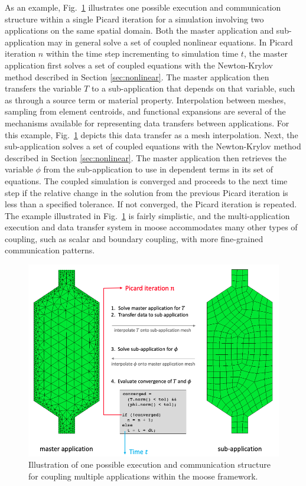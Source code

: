 As an example, Fig.\ \ref{fig:multiapp} illustrates one possible execution and communication structure within a single Picard iteration for a simulation involving two applications on the same spatial domain. Both the master application and sub-application may in general solve a set of coupled nonlinear equations. In Picard iteration \(n\) within the time step incrementing to simulation time \(t\), the master application first solves a set of coupled equations with the Newton-Krylov method described in Section \ref{sec:nonlinear}. The master application then transfers the variable \(T\) to a sub-application that depends on that variable, such as through a source term or material property. Interpolation between meshes, sampling from element centroids, and functional expansions are several of the mechanisms available for representing data transfers between applications. For this example, Fig.\ \ref{fig:multiapp} depicts this data transfer as a mesh interpolation. Next, the sub-application solves a set of coupled equations with the Newton-Krylov method described in Section \ref{sec:nonlinear}. The master application then retrieves the variable \(\phi\) from the sub-application to use in dependent terms in its set of equations. The coupled simulation is converged and proceeds to the next time step if the relative change in the solution from the previous Picard iteration is less than a specified tolerance. If not converged, the Picard iteration is repeated. The example illustrated in Fig.\ \ref{fig:multiapp} is fairly simplistic, and the multi-application execution and data transfer system in \gls{moose} accommodates many other types of coupling, such as scalar and boundary coupling, with more fine-grained communication patterns. 

\begin{figure}[!h]
\centering
\includegraphics[width=0.9\linewidth]{figs/multiapp.png}
\caption{Illustration of one possible execution and communication structure for coupling multiple applications within the \gls{moose} framework.}
\label{fig:multiapp}
\end{figure}

